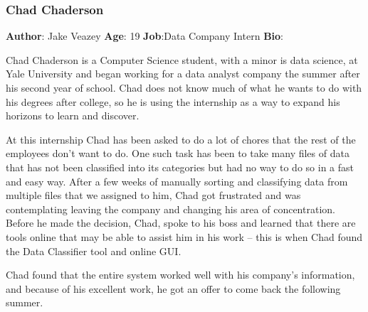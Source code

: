 \documentclass[12pt,oneside,letterpaper]{article}
\begin{document}
\subsubsection{Chad Chaderson}
\textbf{Author}: Jake Veazey\newline
\textbf{Age}: 19\newline
\textbf{Job}:Data Company Intern\newline
\textbf{Bio}:\newline
\par Chad Chaderson is a Computer Science student, with a minor is data science, at Yale University and began working for a data analyst company the summer after his second year of school. Chad does not know much of what he wants to do with his degrees after college, so he is using the internship as a way to expand his horizons to learn and discover. 
\par At this internship Chad has been asked to do a lot of chores that the rest of the employees don't want to do. One such task has been to take many files of data that has not been classified into its categories but had no way to do so in a fast and easy way. After a few weeks of manually sorting and classifying data from multiple files that we assigned to him, Chad got frustrated and was contemplating leaving the company and changing his area of concentration. Before he made the decision, Chad, spoke to his boss and learned that there are tools online that may be able to assist him in his work -- this is when Chad found the Data Classifier tool and online GUI.
\par Chad found that the entire system worked well with his company's information, and because of his excellent work, he got an offer to come back the following summer.
\end{document}
